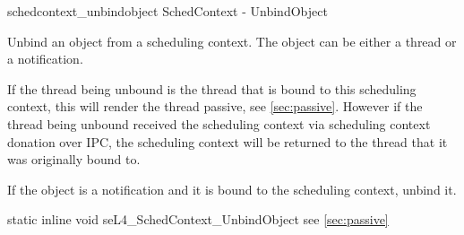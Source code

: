 %
%
%
%

\apidoc
{schedcontext_unbindobject}
{SchedContext - UnbindObject}
{Unbind an object from a scheduling context. The object can be either a thread or a notification.

If the thread being unbound is the thread that is bound to this scheduling context, this will render the thread passive, see \autoref{sec:passive}. However if the thread being unbound received the scheduling context via scheduling context donation over IPC, the scheduling context will be returned to the thread that it was originally bound to.

If the object is a notification and it is bound to the scheduling context, unbind it. 
}
{static inline void seL4\_SchedContext\_UnbindObject}
{
}
{\errorenumdesc}
{see \autoref{sec:passive}}
